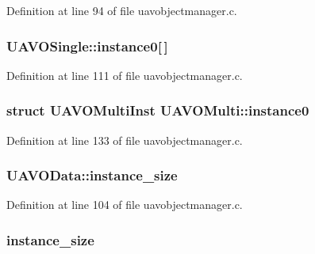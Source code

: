 Definition at line 94 of file uavobjectmanager.\-c.

\hypertarget{group___u_a_v_ga411e3c7c88a81c2f1cd74cab9a3ab5ec}{
\subsubsection[{instance0}]{ U\-A\-V\-O\-Single\-::instance0\mbox{[}$\,$\mbox{]}}}\label{group___u_a_v_ga411e3c7c88a81c2f1cd74cab9a3ab5ec}


Definition at line 111 of file uavobjectmanager.\-c.

\hypertarget{group___u_a_v_ga2512d4c2267924e345079a69ae78b209}{
\subsubsection[{instance0}]{\setlength{\rightskip}{0pt plus 5cm}struct {\bf U\-A\-V\-O\-Multi\-Inst} U\-A\-V\-O\-Multi\-::instance0}}\label{group___u_a_v_ga2512d4c2267924e345079a69ae78b209}


Definition at line 133 of file uavobjectmanager.\-c.

\hypertarget{group___u_a_v_ga1ba7707e476478c92318fe6589e3dfd9}{
\subsubsection[{instance\-\_\-size}]{ U\-A\-V\-O\-Data\-::instance\-\_\-size}}\label{group___u_a_v_ga1ba7707e476478c92318fe6589e3dfd9}


Definition at line 104 of file uavobjectmanager.\-c.

\hypertarget{group___u_a_v_gae673ed9d3b1b0cb5109c647692581785}{
\subsubsection[{instance\-\_\-size}]{ instance\-\_\-size}}\label{group___u_a_v_gae673ed9d3b1b0cb5109c647692581785}



